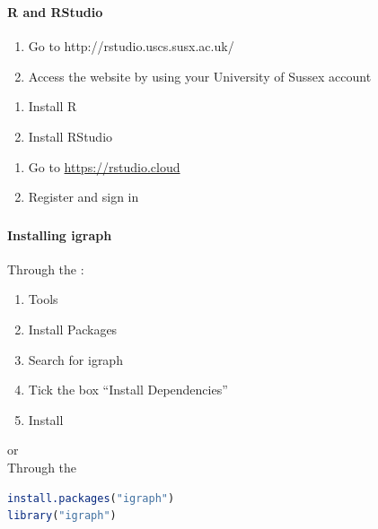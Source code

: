 \documentclass[8pt]{beamer}
\begin{document}
\begin{frame}
\frametitle{\insertsection}
\framesubtitle{R and RStudio}


{\color{blue}{On campus}}
\begin{enumerate}
	\item Go to http://rstudio.uscs.susx.ac.uk/
	\item Access the website by using your University of Sussex account
\end{enumerate}

\medskip

{\color{blue}{On your personal computer}}
\begin{enumerate}
	\item Install R
	\item Install RStudio
\end{enumerate}

\medskip

{\color{blue}{RStudio cloud}}
\begin{enumerate}
	\item Go to \url{https://rstudio.cloud}
	\item Register and sign in
\end{enumerate}

\medskip
\medskip

\end{frame}


\begin{frame}[fragile]
\frametitle{\insertsection}
\framesubtitle{Installing igraph}

Through the {\color{blue}{RStudio interface}}:\\
\begin{enumerate}
	\item Tools
	\item Install Packages
	\item Search for igraph
	\item Tick the box ``Install Dependencies''
	\item Install
\end{enumerate}
\medskip
\medskip
or\\
\medskip
\medskip
Through the {\color{blue}{RStudio console}}

\begin{lstlisting}[language=R]
install.packages("igraph")
library("igraph")
\end{lstlisting}

\end{frame}
\end{document}
